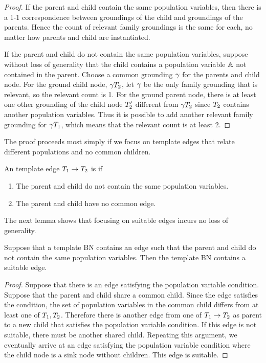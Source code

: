 \documentclass[runningheads,a4paper]{llncs}
\begin{document}
\begin{proof}
If the parent and child contain the same population variables, then there is a 1-1 correspondence between groundings of the child and groundings of the parents. Hence the count of relevant family groundings is the same for each, no matter how parents and child are instantiated. 

If the parent and child do not contain the same population variables, suppose without loss of generality that the child contains a population variable $\mathbb{A}$ not contained in the parent. Choose a common grounding $\gamma$ for the parents and child node. For the ground child node, $\gamma T_{2}$, let $\gamma$ be the only family grounding that is relevant, so the relevant count is 1. For the  ground parent node, there is at least one other grounding of the child node $T_{2}'$ different from $\gamma T_{2}$ since $T_{2}$ contains another population variables. Thus it is possible to add another relevant family grounding for $\gamma T_{1}$, which means that the relevant count is at least 2. 
\end{proof}
The proof proceeds most simply if we focus on template edges that relate different populations and no common children.

\begin{definition} \label{def:suitable}
An template edge $T_{1} \rightarrow T_{2}$ is  if
\begin{enumerate}
\item The parent and child do not contain the same population variables.
\item The parent and child have no common edge.
\end{enumerate}
\end{definition}
The next lemma shows that focusing on suitable edges incurs no loss of generality.

\begin{lemma} \label{lemma:suitable}
Suppose that a template BN contains an edge such that the parent and child do not contain the same population variables. Then the template BN contains a suitable edge. 
\end{lemma}

\begin{proof}
Suppose that there is an edge satisfying the population variable condition. Suppose that the parent and child share a common child. Since the edge satisfies the condition, the set of population variables in the common child differs from at least one of  $T_{1}, T_{2}$. Therefore there is another edge from one of  $T_{1} \rightarrow T_{2}$ as parent to a new child that satisfies the population variable condition. If this edge is not suitable, there must be another shared child. Repeating this argument, we eventually arrive at an edge satisfying the population variable condition  where the child node is a sink node without children. This edge is suitable.
\end{proof}
\end{document}
